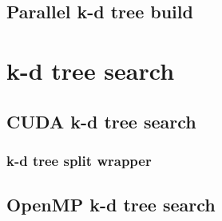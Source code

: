 

\subsection{Parallel k-d tree build} %
\label{sec:paralell_k_d_tree_build}




\section{k-d tree search} %
\label{sec:k_d_tree_search}

\subsection{CUDA k-d tree search} %
\label{sec:cuda_k_d_tree_search}




\subsubsection{k-d tree split wrapper} %
 \label{sub:wrapper}
 






\subsection{OpenMP k-d tree search} %
\label{sec:open_mp_k_d_tree_search}




